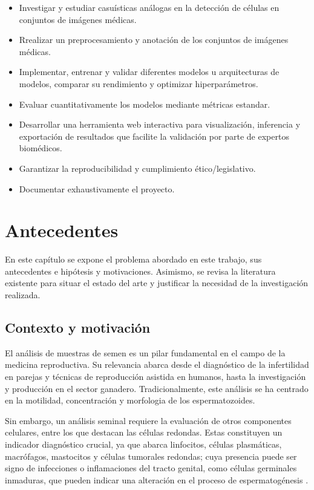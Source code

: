 \documentclass[12pt,a4paper,onecolumn,oneside]{report}
\begin{document}
\begin{itemize}
  \item Investigar y estudiar casuísticas análogas en la detección de células en conjuntos de imágenes médicas.
  \item Rrealizar un preprocesamiento y anotación de los conjuntos de imágenes médicas.
  \item Implementar, entrenar y validar diferentes modelos u arquitecturas de modelos, comparar su rendimiento y optimizar hiperparámetros.
  \item Evaluar cuantitativamente los modelos mediante métricas estandar.
  \item Desarrollar una herramienta web interactiva para visualización, inferencia y exportación de resultados que facilite la validación por parte de expertos biomédicos.
  \item Garantizar la reproducibilidad y cumplimiento ético/legislativo.
  \item Documentar exhaustivamente el proyecto.
\end{itemize}


\chapter{Antecedentes} %
\label{Antecedentes}

En este capítulo se expone el problema abordado en este trabajo, sus antecedentes e hipótesis y motivaciones. 
Asimismo, se revisa la literatura existente para situar el estado del arte y justificar la necesidad de la investigación realizada.

\section{Contexto y motivación}
\label{sec:Contexto y motivación}

El análisis de muestras de semen es un pilar fundamental en el campo de la medicina reproductiva. Su relevancia abarca desde el diagnóstico 
de la infertilidad en parejas y técnicas de reproducción asistida en humanos, hasta la investigación y producción en el sector ganadero. Tradicionalmente,
este análisis se ha centrado en la motilidad, concentración y morfologia de los espermatozoides.

Sin embargo, un análisis seminal requiere la evaluación de otros componentes celulares, entre los que destacan las células redondas. 
Estas constituyen un indicador diagnóstico crucial, ya que abarca linfocitos, células plasmáticas, macrófagos, mastocitos y células tumorales redondas; cuya presencia puede ser signo de infecciones o inflamaciones 
del tracto genital, como células germinales inmaduras, que pueden indicar una alteración en el proceso de espermatogénesis \cite{HamiltonThorneRoundCells}.
\end{document}
